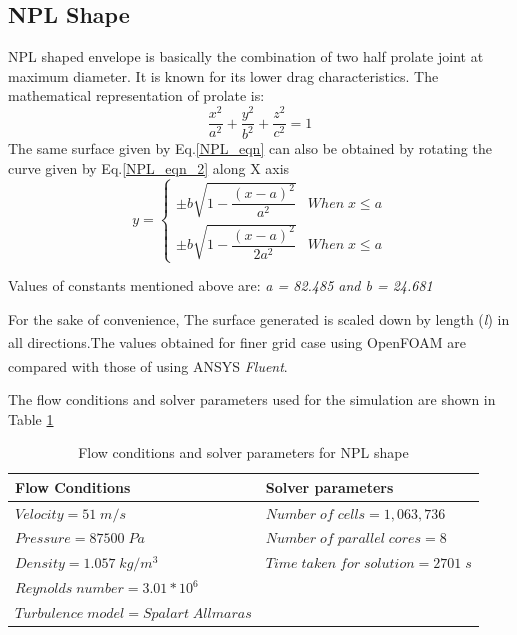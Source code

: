 \subsection{NPL Shape}
NPL shaped envelope is basically the combination of two half prolate joint at maximum diameter. It is known for its lower drag characteristics. The mathematical representation of prolate is:
\begin{equation}
\frac{x^{2}}{a^{2}} + \frac{y^{2}}{b^{2}} + \frac{z^{2}}{c^{2}} = 1
\label{NPL_eqn}
\end{equation}
The same surface given by Eq.\ref{NPL_eqn} can also be obtained by rotating the curve given by Eq.\ref{NPL_eqn_2} along X axis
\begin{equation}
y = \begin{cases}
\pm b \sqrt{1-\dfrac{(x-a)^{2}}{a^{2}}} & When \; x \le a \\
\pm b \sqrt{1-\dfrac{(x-a)^{2}}{2a^{2}}} & When \; x \le a
\end{cases}
\label{NPL_eqn_2}
\end{equation}

Values of constants mentioned above are: \textit{a = 82.485  \quad and \quad b = 24.681  }

For the sake of convenience, The surface generated is scaled down by length (\textit{l}) in all directions.The values obtained for finer grid case using OpenFOAM\textsuperscript{\textregistered} are compared with those of using ANSYS\textsuperscript{\textregistered} \textit{Fluent}. 

The flow conditions and solver parameters used for the simulation are shown in Table \ref{Flow conditions and solver parametres for NPL shape}

\begin{table}[H]
	\caption{Flow conditions and solver parameters for NPL shape}
	\label{Flow conditions and solver parametres for NPL shape}
	\centering
	\begin{tabular}{ll}
		\hline \hline
		Flow Conditions & Solver parameters  \\ \hline \hline
		
		$ Velocity = 51 \; m/s$ & $Number \; of \; cells = 1,063,736$    \\  
		$ Pressure = 87500 \; Pa $ & $ Number \; of \; parallel \; cores = 8 $     \\
		$ Density = 1.057 \; kg/m^{3} $ & $ Time \; taken \; for \; solution = 2701 \; s  $    \\
		$ Reynolds \; number = 3.01 * 10^{6} $ &    \\
		$ Turbulence \; model = Spalart \; Allmaras $ &     \\
		\hline
	\end{tabular}
\end{table}



